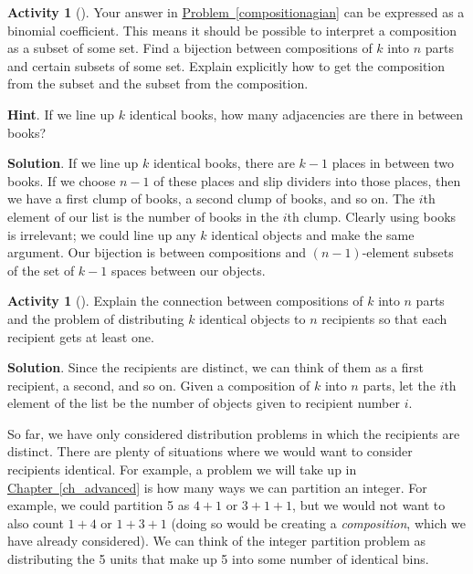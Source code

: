 \documentclass[10pt,]{book}
\theoremstyle{plain}
\theoremstyle{definition}
\theoremstyle{definition}
\theoremstyle{definition}
\newtheorem{activity}[project]{Activity}
\numberwithin{equation}{chapter}
\begin{document}
\begin{activity}[]\label{activity-122}
\hypertarget{p-867}{}%
Your answer in \hyperref[compositionagian]{Problem~\ref{compositionagian}} can be expressed as a binomial coefficient. This means it should be possible to interpret a composition as a subset of some set. Find a bijection between compositions of \(k\) into \(n\) parts and certain subsets of some set.  Explain explicitly how to get the composition from the subset and the subset from the composition.%
\par\smallskip%
\noindent\textbf{Hint}.\hypertarget{hint-87}{}\quad%
\hypertarget{p-868}{}%
If we line up \(k\) identical books, how many adjacencies are there in between books?%
\par\smallskip%
\noindent\textbf{Solution}.\hypertarget{solution-70}{}\quad%
\hypertarget{p-869}{}%
If we line up \(k\) identical books, there are \(k-1\) places in between two books. If we choose \(n-1\) of these places and slip dividers into those places, then we have a first clump of books, a second clump of books, and so on. The \(i\)th element of our list is the number of books in the \(i\)th clump. Clearly using books is irrelevant; we could line up any \(k\) identical objects and make the same argument. Our bijection is between compositions and \((n-1)\)-element subsets of the set of \(k-1\) spaces between our objects.%
\end{activity}
\begin{activity}[]\label{activity-123}
\hypertarget{p-870}{}%
Explain the connection between compositions of \(k\) into \(n\) parts and the problem of distributing \(k\) identical objects to \(n\) recipients so that each recipient gets at least one.%
\par\smallskip%
\noindent\textbf{Solution}.\hypertarget{solution-71}{}\quad%
\hypertarget{p-871}{}%
Since the recipients are distinct, we can think of them as a first recipient, a second, and so on. Given a composition of \(k\) into \(n\) parts, let the \(i\)th element of the list be the number of objects given to recipient number \(i\).%
\end{activity}
\hypertarget{p-872}{}%
So far, we have only considered distribution problems in which the recipients are distinct.  There are plenty of situations where we would want to consider recipients identical.  For example, a problem we will take up in \hyperref[ch_advanced]{Chapter~\ref{ch_advanced}} is how many ways we can partition an integer.  For example, we could partition 5 as \(4+1\) or \(3+1+1\), but we would not want to also count \(1+4\) or \(1+3+1\) (doing so would be creating a \emph{composition}, which we have already considered).  We can think of the integer partition problem as distributing the 5 units that make up 5 into some number of identical bins.%
\end{document}
